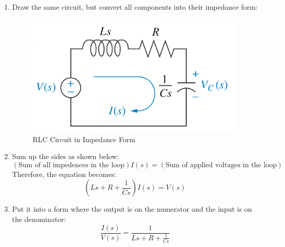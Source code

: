 \documentclass{article}
\theoremstyle{mytheoremstyle}
\theoremstyle{mytheoremstyle}
\theoremstyle{myproblemstyle}
\theoremstyle{break}
\begin{document}
\begin{solution}[\textcolor{blue}{Transfer Function of an RLC Circuit}]~
	\begin{enumerate}
		\item Draw the same circuit, but convert all components into their impedance form:
		      \begin{figure}[H]
			      \includegraphics[scale=0.2]{Simple RLC Circuit in Impedence Form}
			      \centering
			      \caption{RLC Circuit in Impedance Form}
		      \end{figure}
		\item Sum up the sides as shown below:
			\begin{equation}
				(\text{Sum of all impedences in the loop}) I(s) = (\text{Sum of applied voltages in the loop})
			\end{equation}
		Therefore, the equation becomes:
			\begin{equation}
			      (Ls + R + \frac{1}{Cs})I(s) = V(s)
		      \end{equation}
		\item Put it into a form where the output is on the numerator and the input is on the denominator:
		      \begin{equation}
			      \frac{I(s)}{V(s)} = \frac{1}{Ls + R + \frac{1}{Cs}}
		      \end{equation}
	\end{enumerate}
\end{solution}
\end{document}
